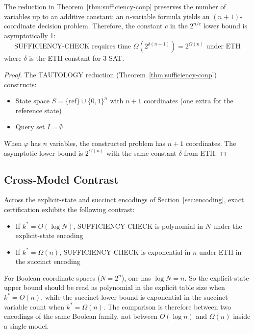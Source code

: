 \begin{proposition}\label{prop:eth-constant}
The reduction in Theorem~\ref{thm:sufficiency-conp} preserves the number of variables up to an additive constant: an $n$-variable formula yields an $(n+1)$-coordinate decision problem. Therefore, the constant $c$ in the $2^{n/c}$ lower bound is asymptotically 1:
\[
\text{SUFFICIENCY-CHECK requires time } \Omega(2^{\delta (n-1)}) = 2^{\Omega(n)} \text{ under ETH}
\]
where $\delta$ is the ETH constant for 3-SAT.
\end{proposition}


\begin{proof}
The TAUTOLOGY reduction (Theorem~\ref{thm:sufficiency-conp}) constructs:
\begin{itemize}
\item State space $S = \{\text{ref}\} \cup \{0,1\}^n$ with $n+1$ coordinates (one extra for the reference state)
\item Query set $I = \emptyset$
\end{itemize}
When $\varphi$ has $n$ variables, the constructed problem has $n+1$ coordinates. The asymptotic lower bound is $2^{\Omega(n)}$ with the same constant $\delta$ from ETH.
\end{proof}

\subsection{Cross-Model Contrast}

\begin{corollary}\label{cor:phase-transition}
Across the explicit-state and succinct encodings of Section~\ref{sec:encoding}, exact certification exhibits the following contrast:
\begin{itemize}
\item If $k^* = O(\log N)$, SUFFICIENCY-CHECK is polynomial in $N$ under the explicit-state encoding
\item If $k^* = \Omega(n)$, SUFFICIENCY-CHECK is exponential in $n$ under ETH in the succinct encoding
\end{itemize}
For Boolean coordinate spaces ($N = 2^n$), one has $\log N = n$. So the explicit-state upper bound should be read as polynomial in the explicit table size when $k^* = O(n)$, while the succinct lower bound is exponential in the succinct variable count when $k^* = \Omega(n)$. The comparison is therefore between two encodings of the same Boolean family, not between $O(\log n)$ and $\Omega(n)$ inside a single model.
\end{corollary}


